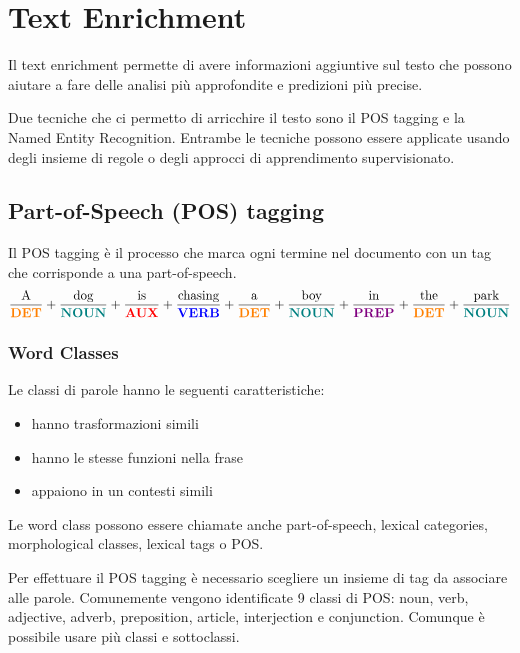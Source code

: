 \chapter{Text Enrichment}

Il text enrichment permette di avere informazioni aggiuntive sul testo che possono aiutare a
fare delle analisi più approfondite e predizioni più precise.

Due tecniche che ci permetto di arricchire il testo sono il POS tagging e la Named Entity Recognition.
Entrambe le tecniche possono essere applicate usando degli insieme di regole o degli approcci di apprendimento supervisionato.

\section{Part-of-Speech (POS) tagging}
Il POS tagging è il processo che marca ogni termine nel documento con un tag che corrisponde a una part-of-speech.
%
{\small\begin{align*}
  \frac{\text{A}}{\color{orange}{\textbf{DET}}} +
  \frac{\text{dog}}{\color{teal}{\textbf{NOUN}}} +
  \frac{\text{is}}{\color{red}{\textbf{AUX}}} +
  \frac{\text{chasing}}{\color{blue}{\textbf{VERB}}} +
  \frac{\text{a}}{\color{orange}{\textbf{DET}}} +
  \frac{\text{boy}}{\color{teal}{\textbf{NOUN}}} +
  \frac{\text{in}}{\color{violet}{\textbf{PREP}}} +
  \frac{\text{the}}{\color{orange}{\textbf{DET}}} +
  \frac{\text{park}}{\color{teal}{\textbf{NOUN}}}
\end{align*}}%

\subsection*{Word Classes}
Le classi di parole hanno le seguenti caratteristiche:
\begin{itemize}
  \item hanno trasformazioni simili
  \item hanno le stesse funzioni nella frase
  \item appaiono in un contesti simili
\end{itemize}
Le word class possono essere chiamate anche part-of-speech, lexical categories, morphological classes, lexical tags o POS.

Per effettuare il POS tagging è necessario scegliere un insieme di tag da associare alle parole.
Comunemente vengono identificate 9 classi di POS: noun, verb, adjective, adverb, preposition, article, interjection e conjunction.
Comunque è possibile usare più classi e sottoclassi.

